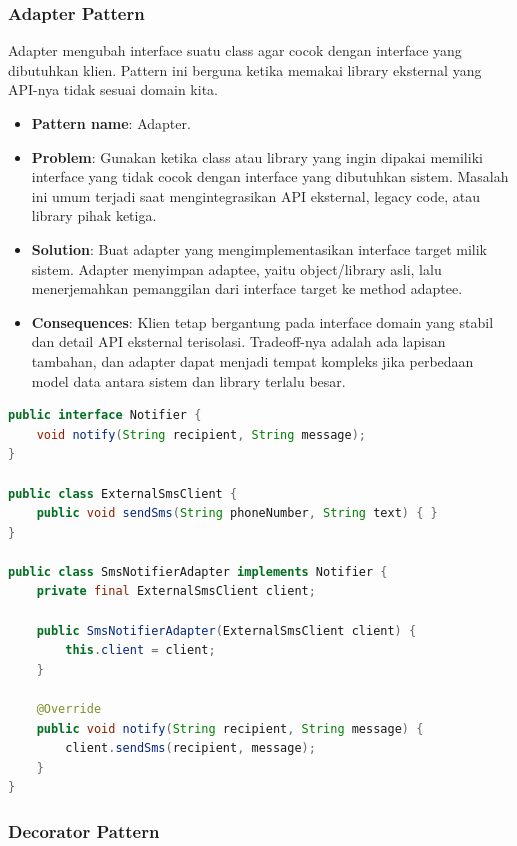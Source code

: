 \subsubsection{Adapter Pattern}

\begin{jawab}
Adapter mengubah interface suatu class agar cocok dengan interface yang dibutuhkan klien. Pattern ini berguna ketika memakai library eksternal yang API-nya tidak sesuai domain kita.
\end{jawab}

\begin{itemize}
    \item \textbf{Pattern name}: Adapter.
    \item \textbf{Problem}: Gunakan ketika class atau library yang ingin dipakai memiliki interface yang tidak cocok dengan interface yang dibutuhkan sistem. Masalah ini umum terjadi saat mengintegrasikan API eksternal, legacy code, atau library pihak ketiga.
    \item \textbf{Solution}: Buat adapter yang mengimplementasikan interface target milik sistem. Adapter menyimpan adaptee, yaitu object/library asli, lalu menerjemahkan pemanggilan dari interface target ke method adaptee.
    \item \textbf{Consequences}: Klien tetap bergantung pada interface domain yang stabil dan detail API eksternal terisolasi. Tradeoff-nya adalah ada lapisan tambahan, dan adapter dapat menjadi tempat kompleks jika perbedaan model data antara sistem dan library terlalu besar.
\end{itemize}

\begin{lstlisting}[language=Java, caption={Adapter Pattern}, label={lst:adapter-pattern}]
public interface Notifier {
    void notify(String recipient, String message);
}

public class ExternalSmsClient {
    public void sendSms(String phoneNumber, String text) { }
}

public class SmsNotifierAdapter implements Notifier {
    private final ExternalSmsClient client;

    public SmsNotifierAdapter(ExternalSmsClient client) {
        this.client = client;
    }

    @Override
    public void notify(String recipient, String message) {
        client.sendSms(recipient, message);
    }
}
\end{lstlisting}

\subsubsection{Decorator Pattern}

